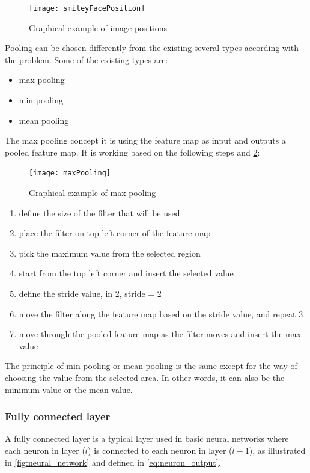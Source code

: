 \begin{figure}[ht]
    \centering
    \texttt{[image: smileyFacePosition]}
    \caption{Graphical example of image positions}
    \label{fig:positions}
\end{figure}

\par
Pooling can be chosen differently from the existing several types according with the problem. Some of the existing types are:
\begin{itemize}
    \item max pooling
    \item min pooling
    \item mean pooling
\end{itemize}

\par
The max pooling concept it is using the feature map as input and outputs a pooled feature map. It is working based on the following steps and \cref{fig:pooling}:

\begin{figure}[H]
    \centering
    \texttt{[image: maxPooling]}
    \caption{Graphical example of max pooling}
    \label{fig:pooling}
\end{figure}

\begin{enumerate}
    \item define the size of the filter that will be used
    \item place the filter on top left corner of the feature map
    \item pick the maximum value from the selected region
    \item start from the top left corner and insert the selected value  
    \item define the stride value, in \cref{fig:pooling}, stride = 2
    \item move the filter along the feature map based on the stride value, and repeat 3
    \item move through the pooled feature map as the filter moves and insert the max value
\end{enumerate}
\par
The principle of min pooling or mean pooling is the same except for the way of choosing the value from the selected area. In other words, it can also be the minimum value or the mean value.\newline


\subsubsection{Fully connected layer}
\par 
A fully connected layer is a typical layer used in basic neural networks where each neuron in layer ($l$) is connected to each neuron in layer ($l-1$), as illustrated in \cref{fig:neural_network} and defined in \cref{eq:neuron_output}.

